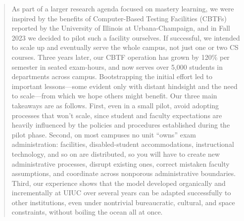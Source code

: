 \begin{abstract}

As part of a larger research agenda focused on mastery learning,
we were inspired by the benefits of Computer-Based Testing Facilities (CBTFs)
reported by
the University of Illinois at Urbana-Champaign,
and in Fall 2023 we decided to pilot such a facility ourselves.
If successful, we intended to scale up and eventually serve
the whole campus, not just one or two CS courses. 
Three years later, our CBTF operation has grown by
120\%  per semester in seated exam-hours, and now serves
over 5,000 students in departments across campus.
Bootstrapping the initial effort led to important lessons---some
evident only with distant hindsight and the need to scale---from which we hope others
might benefit.
Our three main takeaways are as follows.
First, even in a small pilot, avoid adopting
processes that won't scale,
since student and faculty expectations are heavily influenced by the
  policies and procedures established during the pilot phase.
Second, on most campuses no unit ``owns'' exam administration: facilities,
disabled-student accommodations,
instructional technology, and so on are distributed, so you will have to create new
administrative processes, disrupt existing ones, correct mistaken
faculty assumptions, and coordinate across nonporous administrative
boundaries.
Third, our experience shows that the model developed organically and incrementally at
UIUC over several years can be adapted successfully to other
institutions, even under nontrivial bureaucratic, cultural, and space
constraints, without boiling the ocean all at once. 
  
\end{abstract}

